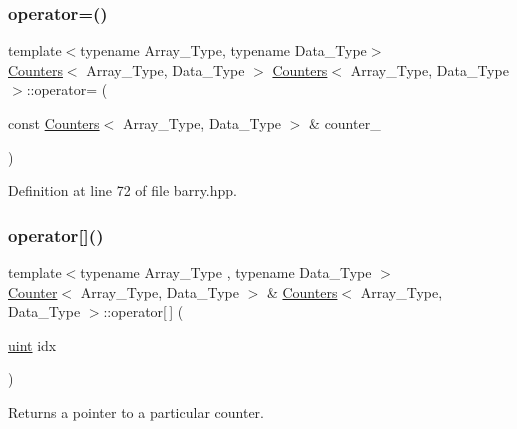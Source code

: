 \mbox{\label{classbarry_1_1_counters_a0edeb22b0b1640f7ada1ef47a30ac486}} 
\subsubsection{\texorpdfstring{operator=()}{operator=()}}
{\footnotesize\ttfamily template$<$typename Array\+\_\+\+Type, typename Data\+\_\+\+Type$>$ \\
\hyperlink{classbarry_1_1_counters}{Counters}$<$ Array\+\_\+\+Type, Data\+\_\+\+Type $>$ \hyperlink{classbarry_1_1_counters}{Counters}$<$ Array\+\_\+\+Type, Data\+\_\+\+Type $>$\+::operator= (\begin{DoxyParamCaption}\item[{const \hyperlink{classbarry_1_1_counters}{Counters}$<$ Array\+\_\+\+Type, Data\+\_\+\+Type $>$ \&}]{counter\+\_\+ }\end{DoxyParamCaption})}



Definition at line 72 of file barry.\+hpp.

\mbox{\label{classbarry_1_1_counters_a031002f578171aaa615d08b1a2f9be40}} 
\subsubsection{\texorpdfstring{operator[]()}{operator[]()}}
{\footnotesize\ttfamily template$<$typename Array\+\_\+\+Type , typename Data\+\_\+\+Type $>$ \\
\hyperlink{classbarry_1_1_counter}{Counter}$<$ Array\+\_\+\+Type, Data\+\_\+\+Type $>$ \& \hyperlink{classbarry_1_1_counters}{Counters}$<$ Array\+\_\+\+Type, Data\+\_\+\+Type $>$\+::operator\mbox{[}$\,$\mbox{]} (\begin{DoxyParamCaption}\item[{\hyperlink{namespacebarry_a11dfc53ddb4672278319aa04f1e09a6c}{uint}}]{idx }\end{DoxyParamCaption})\hspace{0.3cm}{\ttfamily [inline]}}



Returns a pointer to a particular counter. 


